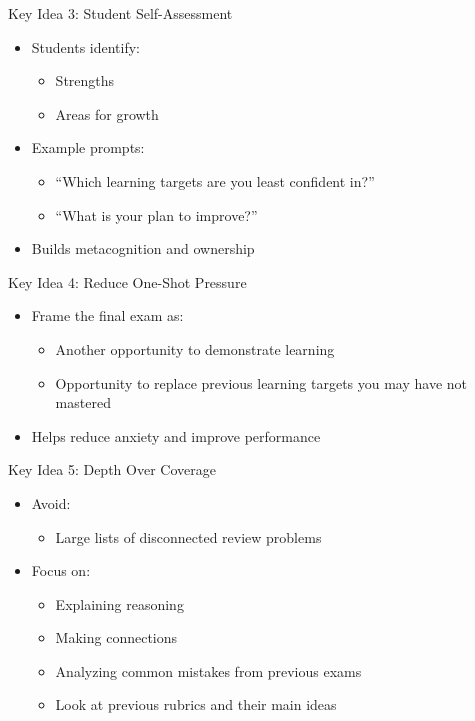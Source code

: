 \documentclass[dvipsnames]{beamer}
\begin{document}
\begin{frame}{Key Idea 3: Student Self-Assessment}
\begin{itemize}
    \item Students identify:
    \begin{itemize}
        \item Strengths
        \item Areas for growth
    \end{itemize}
    
    \item Example prompts:
    \begin{itemize}
        \item ``Which learning targets are you least confident in?''
        \item ``What is your plan to improve?''
    \end{itemize}
    
    \item Builds metacognition and ownership
\end{itemize}
\end{frame}

\begin{frame}{Key Idea 4: Reduce One-Shot Pressure}
\begin{itemize}
    \item Frame the final exam as:
    \begin{itemize}
        \item Another opportunity to demonstrate learning
        \item Opportunity to replace previous learning targets you may have not mastered
    \end{itemize}
    
    \item Helps reduce anxiety and improve performance
\end{itemize}
\end{frame}

\begin{frame}{Key Idea 5: Depth Over Coverage}
\begin{itemize}
    \item Avoid:
    \begin{itemize}
        \item Large lists of disconnected review problems
    \end{itemize}
    
    \item Focus on:
    \begin{itemize}
        \item Explaining reasoning
        \item Making connections
        \item Analyzing common mistakes from previous exams
        \item Look at previous rubrics and their main ideas
    \end{itemize}
    
\end{itemize}
\end{frame}
\end{document}
